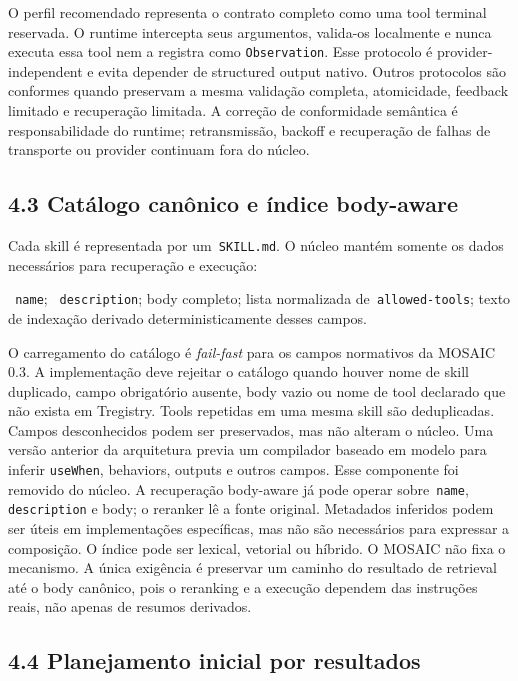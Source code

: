 \documentclass[12pt,a4paper]{article}
\begin{document}
O perfil recomendado representa o contrato completo como uma tool terminal reservada. O runtime intercepta seus argumentos, valida-os localmente e nunca executa essa tool nem a registra como \texttt{Observation}. Esse protocolo é provider-independent e evita depender de structured output nativo. Outros protocolos são conformes quando preservam a mesma validação completa, atomicidade, feedback limitado e recuperação limitada. A correção de conformidade semântica é responsabilidade do runtime; retransmissão, backoff e recuperação de falhas de transporte ou provider continuam fora do núcleo.

\subsection*{4.3 Catálogo canônico e índice body-aware}

Cada skill é representada por um\texttt{ SKILL.md}. O núcleo mantém somente os dados necessários para recuperação e execução:


\noindent \textbullet{}\texttt{ name}; \textbullet{}\texttt{ description}; \textbullet{} body completo; \textbullet{} lista normalizada de\texttt{ allowed-tools}; \textbullet{} texto de indexação derivado deterministicamente desses campos.\par

O carregamento do catálogo é\textit{ fail-fast} para os campos normativos da MOSAIC 0.3. A implementação deve rejeitar o catálogo quando houver nome de skill duplicado, campo obrigatório ausente, body vazio ou nome de tool declarado que não exista em Tregistry. Tools repetidas em uma mesma skill são deduplicadas. Campos desconhecidos podem ser preservados, mas não alteram o núcleo. Uma versão anterior da arquitetura previa um compilador baseado em modelo para inferir \texttt{useWhen}, behaviors, outputs e outros campos. Esse componente foi removido do núcleo. A recuperação body-aware já pode operar sobre\texttt{ name},\texttt{ description} e body; o reranker lê a fonte original. Metadados inferidos podem ser úteis em implementações específicas, mas não são necessários para expressar a composição. O índice pode ser lexical, vetorial ou híbrido. O MOSAIC não fixa o mecanismo. A única exigência é preservar um caminho do resultado de retrieval até o body canônico, pois o reranking e a execução dependem das instruções reais, não apenas de resumos derivados.


\subsection*{4.4 Planejamento inicial por resultados}
\end{document}
